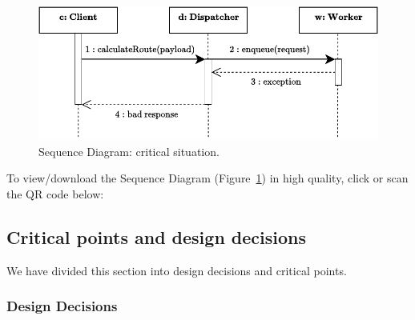 \documentclass[a4paper]{article}
\begin{document}
    \begin{figure}[!htp]
        \centering
        \includegraphics[width=\textwidth]{img/sequence-diagram-4.pdf}
        \caption{Sequence Diagram: critical situation.}
        \label{fig: Sequence Diagram: critical situation}
    \end{figure}

    \noindent
    To view/download the Sequence Diagram (Figure~\ref{fig: Sequence Diagram: critical situation}) in high quality, click or scan the QR code below:
    \begin{center}
    \end{center}

    \newpage

    \subsection{Critical points and design decisions}\label{subsection: Critical points and design decisions}

    We have divided this section into design decisions and critical points.

    \subsubsection*{Design Decisions}
\end{document}
